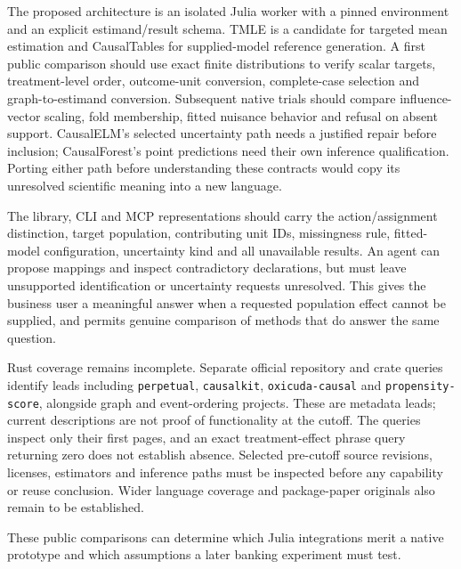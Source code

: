 The proposed architecture is an isolated Julia worker with a pinned
environment and an explicit estimand/result schema. TMLE is a candidate for
targeted mean estimation and CausalTables for supplied-model reference
generation. A first public comparison should use exact finite distributions
to verify scalar targets, treatment-level order, outcome-unit conversion,
complete-case selection and graph-to-estimand conversion. Subsequent native
trials should compare influence-vector scaling, fold membership, fitted
nuisance behavior and refusal on absent support. CausalELM's selected
uncertainty path needs a justified repair before inclusion; CausalForest's
point predictions need their own inference qualification. Porting either
path before understanding these contracts would copy its unresolved
scientific meaning into a new language.

The library, CLI and MCP representations should carry the action/assignment
distinction, target population, contributing unit IDs, missingness rule,
fitted-model configuration, uncertainty kind and all unavailable results.
An agent can propose mappings and inspect contradictory declarations, but
must leave unsupported identification or uncertainty requests unresolved.
This gives the business user a meaningful answer when a requested population
effect cannot be supplied, and permits genuine comparison of methods that
do answer the same question.

Rust coverage remains incomplete. Separate official repository and crate
queries identify leads including \texttt{perpetual}, \texttt{causalkit},
\texttt{oxicuda-causal} and \texttt{propensity-score}, alongside graph and
event-ordering projects. These are metadata leads; current descriptions are
not proof of functionality at the cutoff. The queries inspect only their
first pages, and an exact treatment-effect phrase query returning zero does
not establish absence. Selected pre-cutoff source revisions, licenses,
estimators and inference paths must be inspected before any capability or
reuse conclusion. Wider language coverage and package-paper originals also
remain to be established. \citep{exec21_effects_discovery}

These public comparisons can determine which Julia integrations merit a
native prototype and which assumptions a later banking experiment must test.
